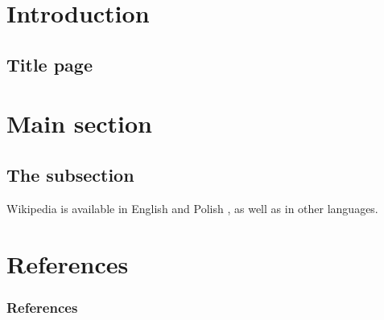 \section{Introduction}

\subsection{Title page}

\begin{frame}

\titlepage


\end{frame}

\section{Main section}

\subsection{The subsection}

\begin{frame}

Wikipedia is available in English \autocite{wiki_en} and Polish \autocite{wiki_pl}, as well as in other languages.


\end{frame}

\section{References}

\begin{frame}
\frametitle{References}

\printbibliography


\end{frame}
